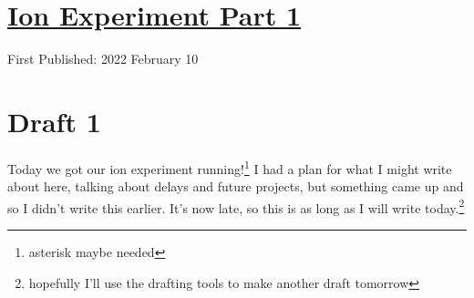 \documentclass[12pt]{article}[titlepage]
\newcommand{\1}{\={a}}
\newcommand{\2}{\={e}}
\newcommand{\3}{\={\i}}
\newcommand{\4}{\=o}
\newcommand{\5}{\=u}
\newcommand{\6}{\={A}}
\renewcommand{\,}{\textsuperscript{,}}
\begin{document}
\doublespacing
\section{\href{ions.html}{Ion Experiment Part 1}}
First Published: 2022 February 10

\section{Draft 1}
Today we got our ion experiment running!\footnote{asterisk maybe needed}
I had a plan for what I might write about here, talking about delays and future projects, but something came up and so I didn't write this earlier.
It's now late, so this is as long as I will write today.\footnote{hopefully I'll use the drafting tools to make another draft tomorrow}
\end{document}
